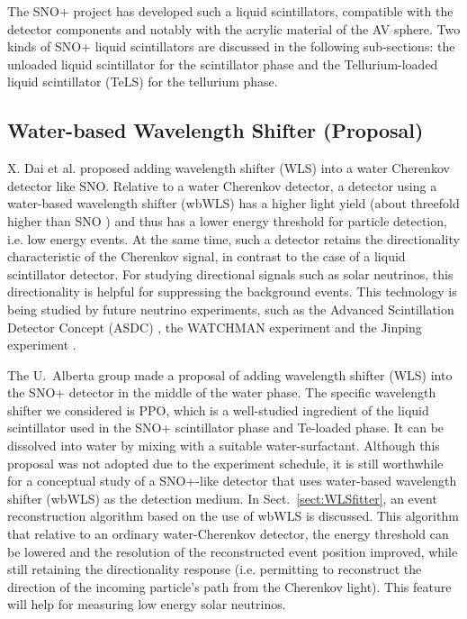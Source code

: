 The SNO+ project has developed such a liquid scintillators, compatible with the detector components and notably with the acrylic material of the AV sphere. Two kinds of SNO+ liquid scintillators are discussed in the following sub-sections: the unloaded liquid scintillator for the scintillator phase and the Tellurium-loaded liquid scintillator (TeLS) for the tellurium phase.

\subsection{Water-based Wavelength Shifter (Proposal)}\label{sect:wbWLS}

X. Dai et al. \cite{dai2008wavelength} proposed adding wavelength shifter (WLS) into a water Cherenkov detector like SNO. Relative to a water Cherenkov detector, a detector using a water-based wavelength shifter (wbWLS) has a higher light yield (about threefold higher than SNO \cite{dai2008wavelength}) and thus has a lower energy threshold for particle detection, i.e. low energy events. At the same time, such a detector retains the directionality characteristic of the Cherenkov signal, in contrast to the case of a liquid scintillator detector. For studying directional signals such as solar neutrinos, this directionality is helpful for suppressing the background events. This technology is being studied by future neutrino experiments, such as the Advanced Scintillation Detector Concept (ASDC) \cite{alonso2014advanced}, the WATCHMAN experiment \cite{askins2015physics} and the Jinping experiment \cite{beacom2017physics}.

The U.~Alberta group made a proposal of adding wavelength shifter (WLS) into the SNO+ detector in the middle of the water phase. The specific wavelength shifter we considered is PPO, which is a well-studied ingredient of the liquid scintillator used in the SNO+ scintillator phase and Te-loaded phase. It can be dissolved into water by mixing with a suitable water-surfactant. Although this proposal was not adopted due to the experiment schedule, it is still worthwhile for a conceptual study of a SNO+-like detector that uses water-based wavelength shifter (wbWLS) as the detection medium. In Sect.~\ref{sect:WLSfitter}, an event reconstruction algorithm based on the use of wbWLS is discussed. This algorithm that relative to an ordinary water-Cherenkov detector, the energy threshold can be lowered and the resolution of the reconstructed event position improved, while still retaining the directionality response (i.e. permitting to reconstruct the direction of the incoming particle's path from the Cherenkov light). This feature will help for measuring low energy solar neutrinos.

